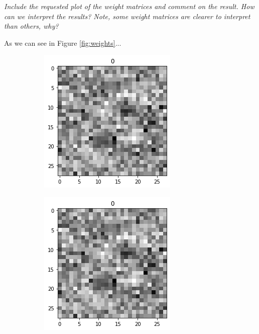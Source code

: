 \documentclass[a4paper,10pt]{article}
\begin{document}
	\textit{Include the requested plot of the weight matrices and comment on the result. How can we interpret the results? Note, some weight matrices are clearer to interpret than others, why?}
	
	As we can see in Figure \ref{fig:weights}...
	
	
	\begin{figure}[H]
		\centering
		\begin{subfigure}[b]{0.24\textwidth}
			\centering
			\includegraphics[width=\textwidth]{weights0}
		\end{subfigure}
		\begin{subfigure}[b]{0.24\textwidth}
			\centering
			\includegraphics[width=\textwidth]{weights0}

\end{subfigure}
\end{figure}
\end{document}
